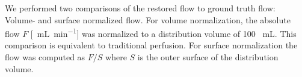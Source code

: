 \documentclass[final,5p,times,twocolumn]{elsarticle}
\begin{document}
	We performed two comparisons of the restored flow to ground truth flow: Volume- and surface normalized flow. For volume normalization, the absolute flow $F$ [\SI{}{\milli\liter\per\minute}] was normalized to a distribution volume of 100 \SI{}{\milli\liter}. This comparison is equivalent to traditional perfusion. %
For surface normalization the flow was computed as $F/S$ where $S$ is the outer surface of the distribution volume.
\end{document}
